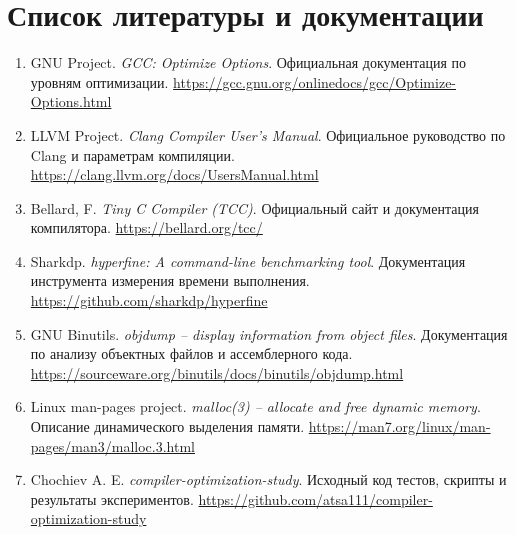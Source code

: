 \documentclass[a4paper]{article}
\begin{document}
\section{Список литературы и документации}
\begin{enumerate}[nosep, leftmargin=*]
    \item GNU Project. \textit{GCC: Optimize Options}. Официальная документация по уровням оптимизации. \url{https://gcc.gnu.org/onlinedocs/gcc/Optimize-Options.html}
    \item LLVM Project. \textit{Clang Compiler User's Manual}. Официальное руководство по Clang и параметрам компиляции. \url{https://clang.llvm.org/docs/UsersManual.html}
    \item Bellard, F. \textit{Tiny C Compiler (TCC)}. Официальный сайт и документация компилятора. \url{https://bellard.org/tcc/}
    \item Sharkdp. \textit{hyperfine: A command-line benchmarking tool}. Документация инструмента измерения времени выполнения. \url{https://github.com/sharkdp/hyperfine}
    \item GNU Binutils. \textit{objdump -- display information from object files}. Документация по анализу объектных файлов и ассемблерного кода. \url{https://sourceware.org/binutils/docs/binutils/objdump.html}
    \item Linux man-pages project. \textit{malloc(3) -- allocate and free dynamic memory}. Описание динамического выделения памяти. \url{https://man7.org/linux/man-pages/man3/malloc.3.html}
    \item Chochiev A. E. \textit{compiler-optimization-study}. Исходный код тестов, скрипты и результаты экспериментов. \url{https://github.com/atsa111/compiler-optimization-study}
\end{enumerate}
\end{document}
